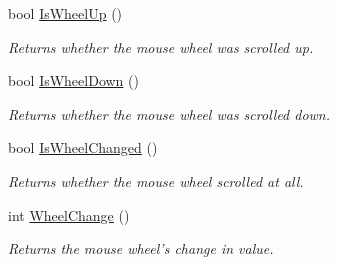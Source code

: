 \begin{DoxyCompactItemize}
bool \hyperlink{class_tri_devs_1_1_tri_engine2_d_1_1_input_1_1_input_manager_aa4d5c302876f5e4f99bbca7381f3d58b}{Is\-Wheel\-Up} ()
\begin{DoxyCompactList}\small\item\em Returns whether the mouse wheel was scrolled up. \end{DoxyCompactList}\item 
bool \hyperlink{class_tri_devs_1_1_tri_engine2_d_1_1_input_1_1_input_manager_a3d5c73853f0df96af5d76584bea512b2}{Is\-Wheel\-Down} ()
\begin{DoxyCompactList}\small\item\em Returns whether the mouse wheel was scrolled down. \end{DoxyCompactList}\item 
bool \hyperlink{class_tri_devs_1_1_tri_engine2_d_1_1_input_1_1_input_manager_a246df48ba2c2d15aba537f19abb806da}{Is\-Wheel\-Changed} ()
\begin{DoxyCompactList}\small\item\em Returns whether the mouse wheel scrolled at all. \end{DoxyCompactList}\item 
int \hyperlink{class_tri_devs_1_1_tri_engine2_d_1_1_input_1_1_input_manager_af8aa353e5d9434776181a42312c1499b}{Wheel\-Change} ()
\begin{DoxyCompactList}\small\item\em Returns the mouse wheel's change in value. \end{DoxyCompactList}\end{DoxyCompactItemize}
